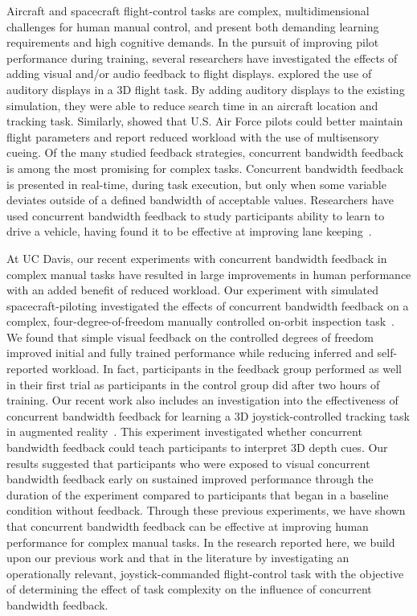 Aircraft and spacecraft flight-control tasks are complex, multidimensional challenges for human manual control, and present both demanding learning requirements and high cognitive demands.
In the pursuit of improving pilot performance during training, several researchers have investigated the effects of adding visual and/or audio feedback to flight displays.
\citeauthor{doi:10.1518/001872096778940859} explored the use of auditory displays in a 3D flight task.
By adding auditory displays to the existing simulation, they were able to reduce search time in an aircraft location and tracking task.
Similarly, \citeauthor{doi:10.1207/s15327108ijap1403} showed that U.S. Air Force pilots could better maintain flight parameters and report reduced workload with the use of multisensory cueing.
Of the many studied feedback strategies, concurrent bandwidth feedback is among the most promising for complex tasks.
Concurrent bandwidth feedback is presented in real-time, during task execution, but only when some variable deviates outside of a defined bandwidth of acceptable values.
Researchers have used concurrent bandwidth feedback to study participants ability to learn to drive a vehicle, having found it to be effective at improving lane keeping~\citep{de_groot_effect_2011}.

At UC Davis, our recent experiments with concurrent bandwidth feedback in complex manual tasks have resulted in large improvements in human performance with an added benefit of reduced workload.
Our experiment with simulated spacecraft-piloting investigated the effects of concurrent bandwidth feedback on a complex, four-degree-of-freedom manually controlled on-orbit inspection task~\citep{karasinski_real-time_2017}.
We found that simple visual feedback on the controlled degrees of freedom improved initial and fully trained performance while reducing inferred and self-reported workload.
In fact, participants in the feedback group performed as well in their first trial as participants in the control group did after two hours of training.
Our recent work also includes an investigation into the effectiveness of concurrent bandwidth feedback for learning a 3D joystick-controlled tracking task in augmented reality~\citep{karasinski_evaluating_2019}.
This experiment investigated whether concurrent bandwidth feedback could teach participants to interpret 3D depth cues.
Our results suggested that participants who were exposed to visual concurrent bandwidth feedback early on sustained improved performance through the duration of the experiment compared to participants that began in a baseline condition without feedback.
Through these previous experiments, we have shown that concurrent bandwidth feedback can be effective at improving human performance for complex manual tasks.
In the research reported here, we build upon our previous work and that in the literature by investigating an operationally relevant, joystick-commanded flight-control task with the objective of determining the effect of task complexity on the influence of concurrent bandwidth feedback.

